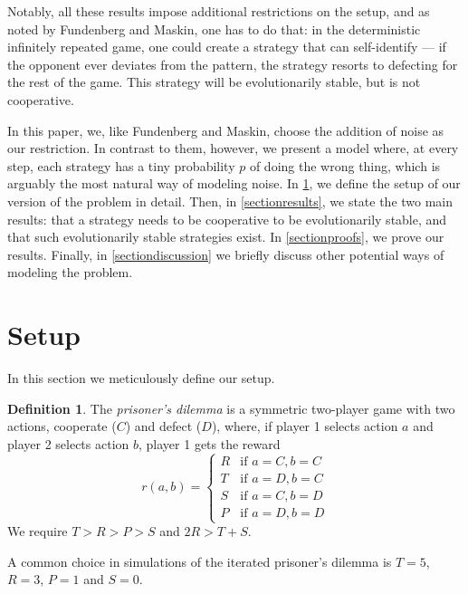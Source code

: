 \documentclass[11pt]{amsart}
\theoremstyle{definition}
\newtheorem{definition}[theorem]{Definition}
\theoremstyle{remark}
\begin{document}
Notably, all these results impose additional restrictions on the setup, and as noted by Fundenberg and Maskin, one has to do that: in the deterministic infinitely repeated game, one could create a strategy that can self-identify — if the opponent ever deviates from the pattern, the strategy resorts to defecting for the rest of the game. This strategy will be evolutionarily stable, but is not cooperative.

In this paper, we, like Fundenberg and Maskin, choose the addition of noise as our restriction. In contrast to them, however, we present a model where, at every step, each strategy has a tiny probability $p$ of doing the wrong thing, which is arguably the most natural way of modeling noise. In \cref{sectionsetup}, we define the setup of our version of the problem in detail. Then, in \cref{sectionresults}, we state the two main results: that a strategy needs to be cooperative to be evolutionarily stable, and that such evolutionarily stable strategies exist. In \cref{sectionproofs}, we prove our results. Finally, in \cref{sectiondiscussion} we briefly discuss other potential ways of modeling the problem.

\section{Setup}
\label{sectionsetup}

In this section we meticulously define our setup.

\begin{definition}
  The \textit{prisoner's dilemma} is a symmetric two-player game with two actions, cooperate ($C$) and defect ($D$), where, if player 1 selects action $a$ and player 2 selects action $b$, player 1 gets the reward
  \begin{equation*}
    r(a,b) = \begin{cases}
      R &\text{if $a = C, b = C$} \\
      T &\text{if $a = D, b = C$} \\
      S &\text{if $a = C, b = D$} \\
      P &\text{if $a = D, b = D$}
    \end{cases}
  \end{equation*}
  We require $T > R > P > S$ and $2R > T + S$.
\end{definition}

A common choice in simulations of the iterated prisoner's dilemma is $T = 5$, $R = 3$, $P = 1$ and $S = 0$.
\end{document}

